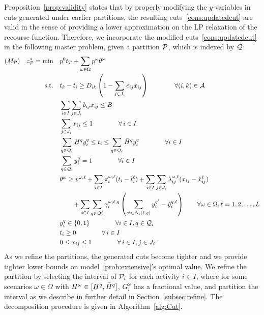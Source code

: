 \documentclass[11pt]{article}
\newcommand{\cA}{{\cal A}}
\newcommand{\cQ}{{\cal Q}}
\newcommand{\noi}{\noindent}
\newcommand{\cP}{{\cal P}}
\renewcommand{\underbar}{\underaccent{\bar}}
\begin{document}
	\noi Proposition~\ref{prop:validity} states that by properly modifying the \(y\)-variables in cuts generated under earlier partitions, the resulting cuts~\eqref{cons:updatedcut} are valid in the sense of providing a lower approximation on the LP relaxation of the recourse function. Therefore, we incorporate the modified cuts~\eqref{cons:updatedcut} in the following master problem, given a partition \(\cP\), which is indexed by \(\cQ\):
	\begin{subequations} \label{prob:masterTightened}
		\begin{align}
		(M_{\cP}) \quad z_{\cP}^* = \min \quad &p^0 t_T + \sum_{\omega \in \Omega} p^\omega \theta^{\omega}\\
		\text{s.t.} \quad & t_k - t_i \geq D_{ik} \left ( 1 - \sum_{j \in J_i} e_{ij} x_{ij} \right ) \qquad \qquad \forall (i,k) \in \cA \label{cons:MpSep}\\
		& \sum_{i \in I} \sum_{j \in J_i} b_{ij}x_{ij} \leq B  \label{cons:MpBudget}\\
		& \sum_{j \in J_i} x_{ij} \leq 1  \qquad \qquad \forall \,i \in I \label{cons:MpSingleBudget}\\
		& \sum_{q \in \cQ_i} \underbar{H}^{q} y_i^{q} \leq t_i \leq \sum_{q \in \cQ_i} \bar{H}^{q} y_i^{q} \qquad \qquad \forall i \in I \label{cons:which_interval_for_t} \\
		& \sum_{q \in \cQ_i} y^q_i = 1 \qquad \qquad \forall i \in I \label{cons:MpY1}\\
		& \theta^\omega \geq v^{\omega,\ell} + \sum_{i \in I} \pi_i^{\omega,\ell} (t_i - \hat{t}_i^{\ell}) + \sum_{i \in I} \sum_{j \in J_i} \lambda_{ij}^{\omega,\ell} (x_{ij} - \hat{x}_{ij}^{\ell}) \nonumber \\
		&\qquad + \sum_{i \in I} \sum_{q \in \cQ^{\ell}_i} \gamma_{i}^{\omega,\ell,q} \left( \sum_{q' \in \Delta_i(\ell,q)}y_i^{q'} - \hat{y}_i^{q,\ell} \right) \qquad  \forall \omega \in \Omega, \ell = 1, 2, \dots, L \label{cons:master_the_cuts} \\
		& y_i^q \in \{0,1\} \qquad \qquad \forall i \in I, q \in \cQ_i \label{cons:binary_y_variables} \\
		& t_i \geq 0 \qquad \qquad \forall \,i \in I\\
		& 0 \leq x_{ij} \leq 1 \qquad \qquad \forall \,i \in I, j \in J_i.
		\end{align}
	\end{subequations}
	As we refine the partitions, the generated cuts become tighter and we provide tighter lower bounds on model~\eqref{prob:extensive}'s optimal value. We refine the partition by selecting the interval of \(\cP_i\) for each activity \(i \in I\), where for some scenarios \(\omega \in \Omega\) with \(H^\omega \in [\underbar{H}^q,\bar{H}^q]\), \(G_i^\omega\) has a fractional value, and partition the interval {as we describe in further detail in Section~\ref{subsec:refine}}. The decomposition procedure is given in Algorithm~\ref{alg:Cut}. \\
\end{document}

